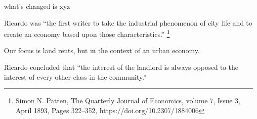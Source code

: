 what's changed is xyz

Ricardo was ``the first writer to take the industrial phenomenon of city life and to create an economy based upon those characteristics.''  \footnote{Simon N. Patten,  The Quarterly Journal of Economics, volume 7, Issue 3, April 1893, Pages 322–352, https://doi.org/10.2307/1884006 }  

Our focus is land rents, but in the context of an urban economy. 

{Ricardo concluded that %
``the interest of the landlord is always opposed to the interest of every other class in the community.'' }



